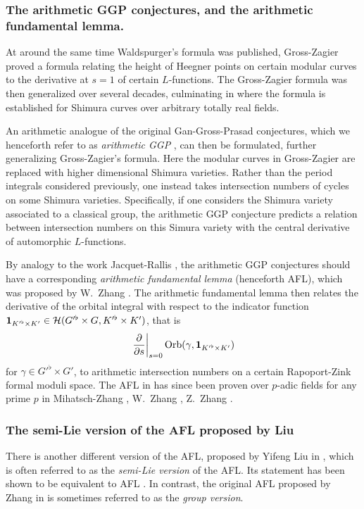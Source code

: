 \subsubsection{The arithmetic GGP conjectures, and the arithmetic fundamental lemma.}
At around the same time Waldspurger's formula was published,
Gross-Zagier \cite{ref:gross_zagier} proved a formula
relating the height of Heegner points
on certain modular curves to the derivative at $s=1$ of certain $L$-functions.
The Gross-Zagier formula was then generalized over several decades,
culminating in \cite{ref:GZshimura} where the formula is established
for Shimura curves over arbitrary totally real fields.

An arithmetic analogue of the original Gan-Gross-Prasad conjectures,
which we henceforth refer to as \emph{arithmetic GGP} \cite{ref:GGP},
can then be formulated, further generalizing Gross-Zagier's formula.
Here the modular curves in Gross-Zagier
are replaced with higher dimensional Shimura varieties.
Rather than the period integrals considered previously,
one instead takes intersection numbers of cycles on some Shimura varieties.
Specifically, if one considers the Shimura variety associated to a classical group,
the arithmetic GGP conjecture predicts a relation between intersection numbers
on this Simura variety with the central derivative of automorphic $L$-functions.

By analogy to the work Jacquet-Rallis \cite{ref:JR},
the arithmetic GGP conjectures should have a corresponding
\emph{arithmetic fundamental lemma} (henceforth AFL),
which was proposed by W.\ Zhang \cite[Conjecture 2.9]{ref:AFL}.
The arithmetic fundamental lemma then relates the derivative
of the orbital integral with respect to the indicator function
$\mathbf{1}_{K'^\flat \times K'} \in \mathcal H(G'^\flat \times G, K'^\flat \times K')$, that is
\[ \left. \pdv{}{s} \right\rvert_{s=0} \operatorname{Orb}(\gamma, \mathbf{1}_{K'^\flat \times K'}) \]
for $\gamma \in G'^\flat \times G'$,
to arithmetic intersection numbers on a certain Rapoport-Zink formal moduli space.
The AFL in \cite{ref:AFL} has since been proven over $p$-adic fields for any prime $p$ in
Mihatsch-Zhang \cite{ref:MZ2021}, W.\ Zhang \cite{ref:Wei2021}, Z.\ Zhang \cite{ref:Zhiyu}.

\subsubsection{The semi-Lie version of the AFL proposed by Liu}
There is another different version of the AFL, proposed by Yifeng Liu in
\cite[Conjecture 1.12]{ref:liuFJ},
which is often referred to as the \emph{semi-Lie version} of the AFL.
Its statement has been shown to be equivalent to AFL
\cite[Remark 1.13]{ref:liuFJ}.
In contrast, the original AFL proposed by Zhang in \cite[Conjecture 2.9]{ref:AFL}
is sometimes referred to as the \emph{group version}.

